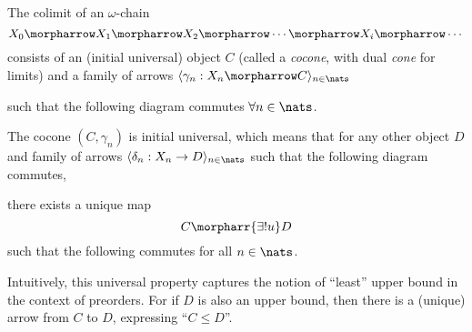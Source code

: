 \begin{definition}
The colimit of an $\omega$-chain
\[
    X_0 \morpharrow X_1 \morpharrow X_2 \morpharrow \cdots \morpharrow X_i
    \morpharrow \cdots
\]
consists of an (initial universal) object $C$ (called a \emph{cocone}, with dual
\emph{cone} for limits) and a family of arrows $\langle \gamma_n : X_n
\morpharrow C \rangle _{n \in \nats}$

\begin{center}
\end{center}

such that the following diagram commutes $\forall n \in \nats$.

\begin{center}
\end{center}

The cocone $(C, \gamma_n)$ is initial universal, which means that for any other
object $D$ and family of arrows
$\langle \delta_n : X_n \rightarrow D\rangle_{n \in \nats}$ such that the
following diagram commutes,
\begin{center}
\end{center}

there exists a unique map
\[
	C \morpharr{\exists ! u} D
\]
such that the following commutes for all $n \in \nats$.
\begin{center}
\end{center}

Intuitively, this universal property captures the notion of ``least'' upper
bound in the context of preorders. For if $D$ is also an upper bound, then there
is a (unique) arrow from $C$ to $D$, expressing ``$C \leq D$''.

\end{definition}

